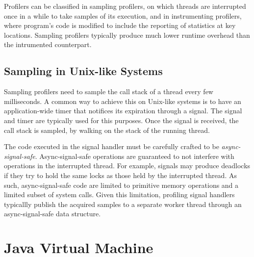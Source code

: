 Profilers can be classified in sampling profilers, on which threads are interrupted once in a while to take samples of its execution, and in instrumenting profilers, where program's code is modified to include the reporting of statistics at key locations. Sampling profilers typically produce much lower runtime overhead than the intrumented counterpart.

\subsection{Sampling in Unix-like Systems}

Sampling profilers need to sample the call stack of a thread every few milliseconds. A common way to achieve this on Unix-like systems is to have an application-wide timer that notifices its expiration through a signal. The  signal and  timer are typically used for this purposes. Once the signal is received, the call stack is sampled, by walking on the stack of the running thread.


The code executed in the signal handler must be carefully crafted to be \emph{async-signal-safe}. Async-signal-safe operations are guaranteed to not interfere with operations in the interrupted thread. For example, signals may produce deadlocks if they try to hold the same locks as those held by the interrupted thread. As such, async-signal-safe code are limited to primitive memory operations and a limited subset of system calls. Given this limitation, profiling signal handlers typicallly publish the acquired samples to a separate worker thread through an async-signal-safe data structure.


\section{Java Virtual Machine}



